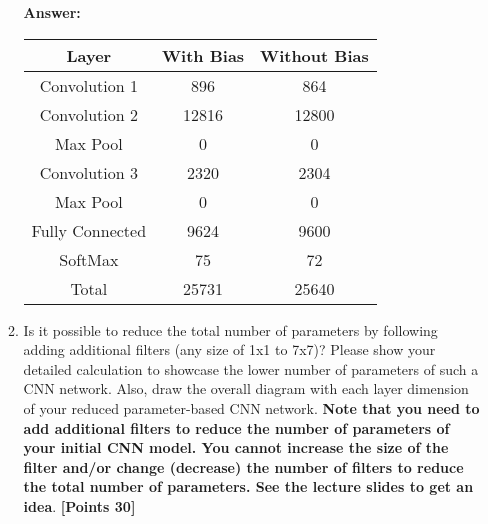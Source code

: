 \documentclass[12pt]{article}
\begin{document}
\begin{enumerate}
\begin{enumerate}
                        \textbf{Answer:}
                        \begin{table}[h]
                              \centering
                              \begin{tabular}{|ccc|}
                                    \hline
                                    \textbf{Layer}  & \textbf{With Bias} & \textbf{Without Bias} \\
                                    \hline
                                    Convolution 1   & 896                & 864                   \\
                                    \hline
                                    Convolution 2   & 12816              & 12800                 \\
                                    \hline
                                    Max Pool        & 0                  & 0                     \\
                                    \hline
                                    Convolution 3   & 2320               & 2304                  \\
                                    \hline
                                    Max Pool        & 0                  & 0                     \\
                                    \hline
                                    Fully Connected & 9624               & 9600                  \\
                                    \hline
                                    SoftMax         & 75                 & 72                    \\
                                    \hline
                                    Total           & 25731              & 25640                 \\
                                    \hline
                              \end{tabular}
                        \end{table}
                  \item Is it possible to reduce the total number of parameters
                        by following adding additional filters (any size of 1x1
                        to 7x7)? Please show your detailed calculation to
                        showcase the lower number of parameters of such a CNN
                        network. Also, draw the overall diagram with each layer
                        dimension of your reduced parameter-based CNN network.
                        \textbf{Note that you need to add additional filters to
                              reduce the number of parameters of your initial CNN
                              model. You cannot increase the size of the filter and/or
                              change (decrease) the number of filters to reduce the
                              total number of parameters. See the lecture slides to
                              get an idea}. \textbf{[Points 30]}


\end{enumerate}
\end{enumerate}
\end{document}
